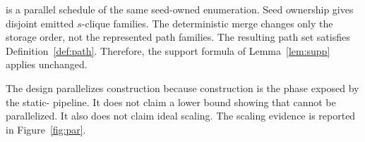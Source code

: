 \paraBuild{} is a parallel schedule of the same seed-owned enumeration.
%
Seed ownership gives disjoint emitted $s$-clique families.
%
The deterministic merge changes only the storage order, not the represented path families.
%
The resulting path set satisfies Definition~\ref{def:path}.
%
Therefore, the support formula of Lemma~\ref{lem:supp} applies unchanged.

The design parallelizes construction because construction is the phase exposed by the static-\cpi{} pipeline.
%
It does not claim a lower bound showing that \spinStar{} cannot be parallelized.
%
It also does not claim ideal scaling.
%
The scaling evidence is reported in Figure~\ref{fig:par}.
